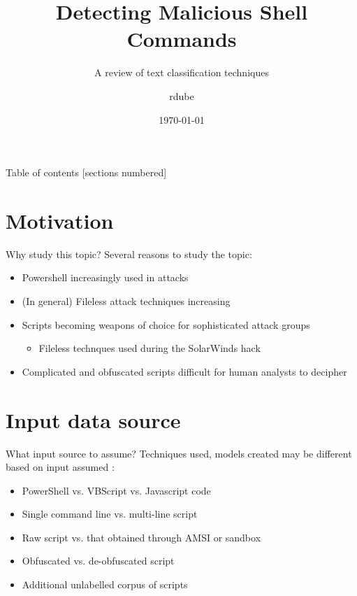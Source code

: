 \documentclass[10pt]{beamer}
\title{Detecting Malicious Shell Commands}
\subtitle{A review of text classification techniques}
\date{\today}
\author{rdube}
\begin{document}
\maketitle

\begin{frame}{Table of contents}
  [sections numbered]
  \tableofcontents[hideallsubsections]
\end{frame}

\section{Motivation}

\begin{frame}[fragile]{Why study this topic?}
	Several reasons to study the topic:
	\begin{itemize}
		\item Powershell increasingly used in attacks \cite{symc2016}
		\item (In general) Fileless attack techniques increasing \cite{symc2017}
		\item Scripts becoming weapons of choice for sophisticated attack groups \cite{msft2017-2}
		\begin{itemize}
			\item Fileless technques used during the SolarWinds hack \cite{zdnet2021}
		\end{itemize}
		\item Complicated and obfuscated scripts difficult for human analysts to decipher \cite{feye2018}
	\end{itemize}
\end{frame}

\section{Input data source}

\begin{frame}{What input source to assume?}
	Techniques used, models created may be different based on input assumed \cite{msft2017-2,msft2019,feye2018}:
	\begin{itemize}
		\item PowerShell vs. VBScript vs. Javascript code 
		\item Single command line vs. multi-line script
		\item Raw script vs. that obtained through AMSI or sandbox
		\item Obfuscated vs. de-obfuscated script
		\item Additional unlabelled corpus of scripts
	\end{itemize}
\end{frame}
\end{document}
